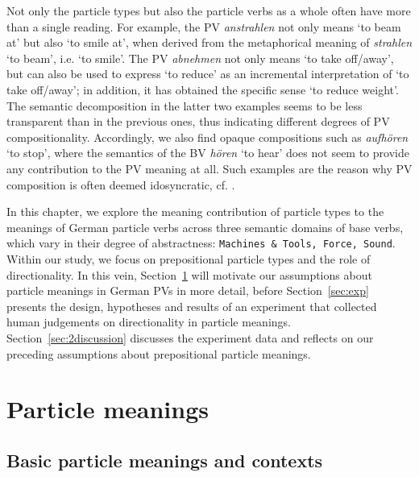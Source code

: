 \documentclass[output=paper]{langsci/langscibook}
\begin{document}
Not only the particle types but also the particle verbs as a whole
often have more than a single reading. For example, the PV
\textit{anstrahlen} not only means `to beam at' but also `to smile
at', when derived from the metaphorical meaning of \textit{strahlen}
`to beam', i.e. `to smile'. The PV \textit{abnehmen} not only means
`to take off/away', but can also be used to express `to reduce' as an
incremental interpretation of `to take off/away'; in addition, it has
obtained the specific sense `to reduce weight'. The semantic
decomposition in the latter two examples seems to be less transparent
than in the previous ones, thus indicating different degrees of PV
compositionality. Accordingly, we also find opaque compositions such
as \textit{aufhören} `to stop', where the semantics of the BV
\textit{hören} `to hear' does not seem to provide any contribution
to the PV meaning at all. Such examples are the reason why PV
composition is often deemed idosyncratic, cf. \cite{Kratzer:03}.

In this chapter, we explore the meaning contribution of particle types
to the meanings of German particle verbs across three semantic domains
of base verbs, which vary in their degree of abstractness:
\texttt{Machines \& Tools, Force, Sound}. Within our study, we focus
on prepositional particle types and the role of directionality. In
this vein, Section~\ref{sec:p-meaning} will motivate our assumptions
about particle meanings in German PVs in more detail, before
Section~\ref{sec:exp} presents the design, hypotheses and results of
an experiment that collected human judgements on directionality in
particle meanings. Section~\ref{sec:2discussion} discusses the
experiment data and reflects on our preceding assumptions about
prepositional particle meanings.


\section{Particle meanings}
\label{sec:p-meaning}

\subsection{Basic particle meanings and contexts}
\end{document}
